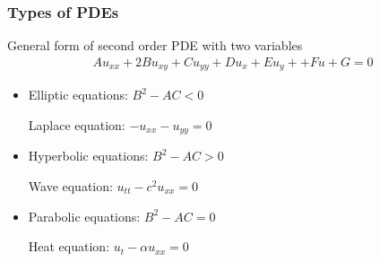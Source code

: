 \begin{frame}
\frametitle{Types of PDEs}

General form of second order PDE with two variables
\begin{align*}
Au_{xx} + 2 Bu_{xy} + Cu_{yy} + Du_{x} + Eu_{y} + + Fu + G = 0
\end{align*}


\begin{itemize}
\item Elliptic equations: $B^2 - AC < 0$

  Laplace equation: $- u_{xx} - u_{yy} = 0$
\item Hyperbolic equations: $B^2 - AC > 0$

  Wave equation: $u_{tt} - c^2 u_{xx} = 0$
\item Parabolic equations: $B^2 - AC = 0$

  Heat equation: $u_{t} - \alpha u_{xx} = 0$
\end{itemize}
\end{frame}
